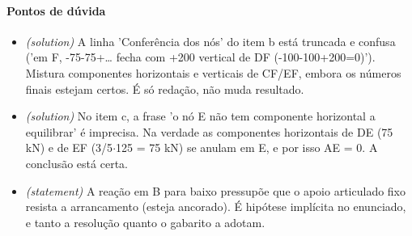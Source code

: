 \documentclass{article}%
\begin{document}
\paragraph{Pontos de dúvida}%
\begin{itemize}%
\item%
\textit{(solution)} A linha 'Conferência dos nós' do item b está truncada e confusa ('em F, -75-75+\ldots{} fecha com +200 vertical de DF (-100-100+200=0)'). Mistura componentes horizontais e verticais de CF/EF, embora os números finais estejam certos. É só redação, não muda resultado.%
\item%
\textit{(solution)} No item c, a frase 'o nó E não tem componente horizontal a equilibrar' é imprecisa. Na verdade as componentes horizontais de DE (75 kN) e de EF (3/5$\cdot$125 = 75 kN) se anulam em E, e por isso AE = 0. A conclusão está certa.%
\item%
\textit{(statement)} A reação em B para baixo pressupõe que o apoio articulado fixo resista a arrancamento (esteja ancorado). É hipótese implícita no enunciado, e tanto a resolução quanto o gabarito a adotam.%
\end{itemize}%
\end{document}
